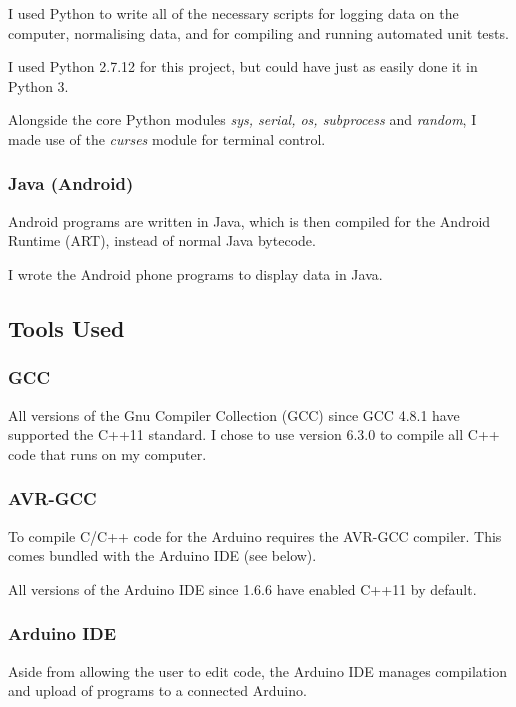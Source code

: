 \documentclass[a4paper]{article}
\begin{document}
I used Python\cite{ppref12} to write all of the necessary scripts for logging data on the computer, normalising data, and for compiling and running automated unit tests.

I used Python 2.7.12 for this project, but could have just as easily done it in Python 3.

Alongside the core Python modules \textit{sys, serial, os, subprocess} and \textit{random}, I made use of the \textit{curses}\cite{ppref13} module for terminal control.

\subsubsection{Java (Android)}

Android\cite{ppref14} programs are written in Java, which is then compiled for the Android Runtime (ART)\cite{ppref15}, instead of normal Java bytecode.

I wrote the Android phone programs to display data in Java.

\subsection{Tools Used}%

\subsubsection{GCC}

All versions of the Gnu Compiler Collection (GCC) since GCC 4.8.1 have supported the C++11 standard\cite{ppref16}. I chose to use version 6.3.0\cite{ppref17} to compile all C++ code that runs on my computer.

\subsubsection{AVR-GCC}

To compile C/C++ code for the Arduino requires the AVR-GCC compiler. This comes bundled with the Arduino IDE\cite{ppref8} (see below).

All versions of the Arduino IDE since 1.6.6 have enabled C++11 by default.

\subsubsection{Arduino IDE}

Aside from allowing the user to edit code, the Arduino IDE\cite{ppref18} manages compilation and upload of programs to a connected Arduino.
\end{document}
